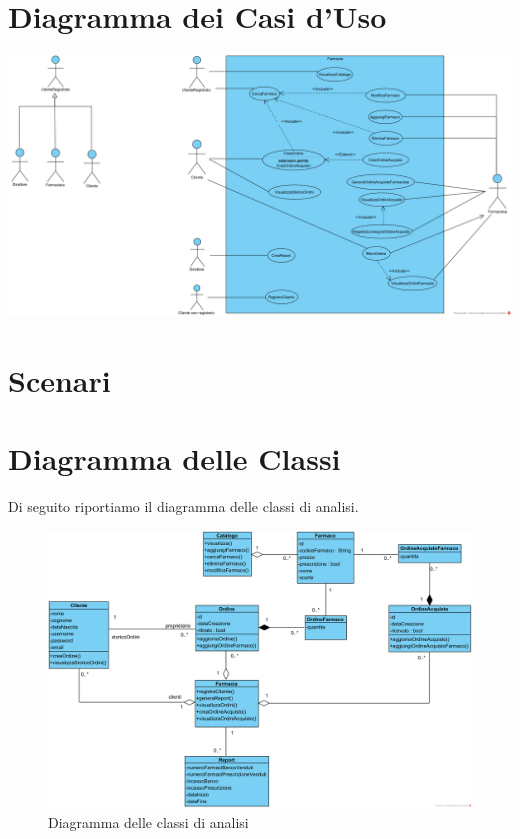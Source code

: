 \section{Diagramma dei Casi d'Uso}
\includegraphics[width=\linewidth]{assets/UseCaseFarmacia.png}

\section{Scenari}

















\pagebreak

\section{Diagramma delle Classi}
Di seguito riportiamo il diagramma delle classi di analisi.
\begin{figure}[h]
    \centering
	\includegraphics[width=\linewidth]{assets/ClassDiagramAnalisi.png}
    \caption{Diagramma delle classi di analisi}
\end{figure}

